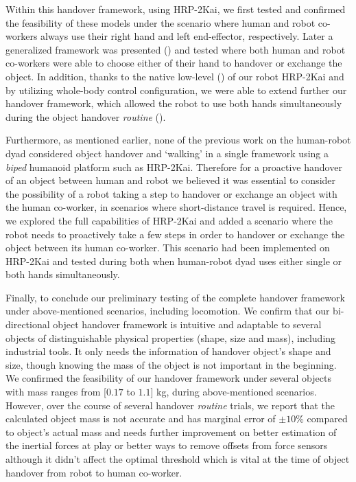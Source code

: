 Within this handover framework, using HRP-2Kai, we first tested and confirmed the feasibility of these models under the scenario where human and robot co-workers always use their right hand and left end-effector, respectively. Later a generalized framework was presented () and tested where both human and robot co-workers were able to choose either of their hand to handover or exchange the object. In addition, thanks to the native low-level () of our robot HRP-2Kai and by utilizing whole-body control configuration, we were able to extend further our handover framework, which allowed the robot to use both hands simultaneously during the object handover \textit{routine} (). 

Furthermore, as mentioned earlier, none of the previous work on the human-robot dyad considered object handover and `walking' in a single framework using a \textit{biped} humanoid platform such as HRP-2Kai. Therefore for a proactive handover of an object between human and robot we believed it was essential to consider the possibility of a robot taking a step to handover or exchange an object with the human co-worker, in scenarios where short-distance travel is required. Hence, we explored the full capabilities of HRP-2Kai and added a scenario where the robot needs to proactively take a few steps in order to handover or exchange the object between its human co-worker. This scenario had been implemented on HRP-2Kai and tested during both when human-robot dyad uses either single or both hands simultaneously. 


Finally, to conclude our preliminary testing of the complete handover framework under above-mentioned scenarios, including locomotion. We confirm that our bi-directional object handover framework is intuitive and adaptable to several objects of distinguishable physical properties (shape, size and mass), including industrial tools. It only needs the information of handover object's shape and size, though knowing the mass of the object is not important in the beginning. We confirmed the feasibility of our handover framework under several objects with mass ranges from [$0.17$ to $1.1$] kg, during above-mentioned scenarios. However, over the course of several handover \textit{routine} trials, we report that the calculated object mass is not accurate and has marginal error of $ \pm10 $\% compared to object's actual mass and needs further improvement on better estimation of the inertial forces at play or  better ways to remove offsets from force sensors although it didn't affect the optimal threshold which is vital at the time of object handover from robot to human co-worker.

